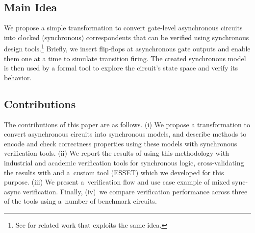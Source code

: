 



\subsection{Main Idea}

We propose a simple transformation to convert gate-level asynchronous circuits
into clocked (synchronous) correspondents that can be verified using
synchronous design tools.\footnote{See  for related work
that exploits the same idea.} Briefly, we insert flip-flops at asynchronous
gate outputs and enable them one at a time to simulate transition firing. The
created synchronous model is then used by a formal tool to explore the
circuit's state space and verify its behavior.

\subsection{Contributions}

The contributions of this paper are as follows. (i) We propose a
transformation to convert asynchronous circuits into synchronous models, and
describe methods to encode and check correctness properties using these models
with synchronous verification tools. (ii) We report the results of using this
methodology with industrial and academic verification tools for synchronous
logic, cross-validating the results with \mpsat{} \cite{khomenko2006logic} and
a~custom tool (ESSET) which we developed for this purpose. (iii) We present
a~verification flow and use case example of mixed sync-async verification.
Finally, (iv)~we compare verification performance across three of the tools
using a~number of benchmark circuits.
